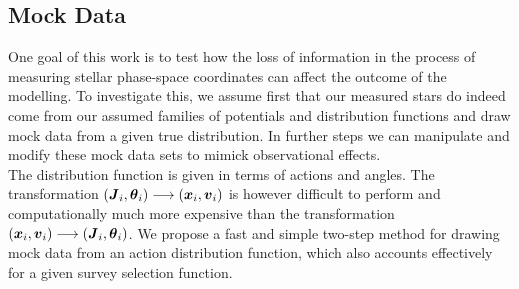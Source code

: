 

\begin{figure*}
\caption{Distribution of mock data in action space (2D iso-density contours enclosing 80\% of the stars, in the two central and the lower left panel) and configuration space (1D histograms in right panels), depending on shape and position of the survey observation volume and temperature of the stellar population. The parameters of the mock data model is given as Test \ref{test:kks2WedgeEx} in Table \ref{tbl:tests}. In the upper left panel we demonstrate the shape of the two different "wedge"-like observation volumes within which we were creating each a "hot" (red) and "cool" (blue) mock data set: a large volume centered on the Galactic plane (solid lines) and a smaller one above the plane (dashed lines). [TO DO: fancybox Legend]} 
\label{fig:kks2WedgeEx}
\end{figure*}




\subsection{Mock Data} \label{sec:mockdata}

One goal of this work is to test how the loss of information in the process of measuring stellar phase-space coordinates can affect the outcome of the modelling. To investigate this, we assume first that our measured stars do indeed come from our assumed families of potentials and distribution functions and draw mock data from a given true distribution. In further steps we can manipulate and modify these mock data sets to mimick observational effects.\\
The distribution function is given in terms of actions and angles. The transformation $(\boldsymbol{J}_i,\boldsymbol{\theta}_i) \longrightarrow (\boldsymbol{x}_i,\boldsymbol{v}_i)$ is however difficult to perform and computationally much more expensive than the transformation $(\boldsymbol{x}_i,\boldsymbol{v}_i) \longrightarrow (\boldsymbol{J}_i,\boldsymbol{\theta}_i)$. We propose a fast and simple two-step method for drawing mock data from an action distribution function, which also accounts effectively for a given survey selection function.


